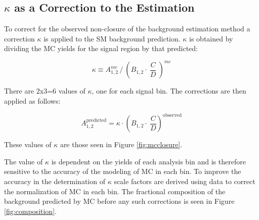 \subsection{$\kappa$ as a Correction to the Estimation}
\label{sec:kappa}

To correct for the observed non-closure of the background estimation method a correction $\kappa$ is applied to the SM background prediction. $\kappa$ is obtained by dividing the MC yields for the signal region by that predicted:

\begin{equation}
\kappa  \equiv A_{1, 2}^{mc} \,/  \ (B_{1, 2} \cdot \ \frac{C} {D} \ )^{mc}
\end{equation}

There are 2x3=6 values of $\kappa$, one for each signal bin. The corrections are then applied as follows:

\begin{equation}
A_{1, 2}^{\mathrm{predicted}} = \kappa \cdot (B_{1, 2} \cdot \ \frac{C}{D})^{\textrm{observed}}
\end{equation}

These values of $\kappa$ are those seen in Figure \ref{fig:mcclosure}.

The value of $\kappa$ is dependent on the yields of each analysis bin and is therefore sensitive to the accuracy of the modeling of MC in each bin. To improve the accuracy in the determination of $\kappa$ scale factors are derived using data to correct the normalization of MC in each bin. The fractional composition of the background predicted by MC before any such corrections is seen in Figure \ref{fig:composition}.

